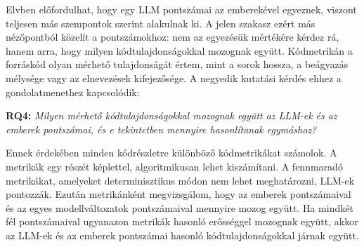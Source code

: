 \documentclass[
]{elteikthesis}[2024/04/26]
\begin{document}
Elvben előfordulhat, hogy egy LLM pontszámai az emberekével egyeznek, viszont
teljesen más szempontok szerint alakulnak ki. %
A jelen szakasz ezért más nézőpontból közelít a pontszámokhoz: nem az egyezésük
mértékére kérdez rá, hanem arra, hogy milyen kódtulajdonságokkal mozognak
együtt. Kódmetrikán a forráskód olyan mérhető tulajdonságát értem, mint a sorok
hossza, a beágyazás mélysége vagy az elnevezések kifejezősége. A negyedik
kutatási kérdés ehhez a gondolatmenethez kapcsolódik:

\textbf{RQ4:} \textit{Milyen mérhető kódtulajdonságokkal %
mozognak együtt az LLM-ek és az emberek pontszámai, és e tekintetben mennyire
hasonlítanak egymáshoz?} %

Ennek érdekében minden kódrészletre különböző kódmetrikákat számolok. A metrikák
egy részét képlettel, algoritmikusan lehet kiszámítani. A fennmaradó metrikákat,
amelyeket determinisztikus módon nem lehet meghatározni, %
LLM-ek pontozzák. Ezután metrikánként megvizsgálom, hogy az emberek
pontszámaival és az egyes modellváltozatok pontszámaival mennyire mozog együtt.
Ha mindkét fél pontszámaival ugyanazon metrikák hasonló erősséggel mozognak
együtt, akkor az LLM-ek és az emberek pontszámai hasonló kódtulajdonságokkal
járnak együtt. %
\end{document}
